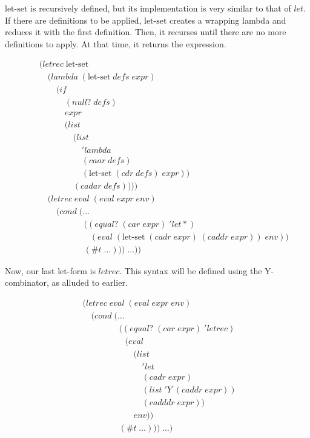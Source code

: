 $\text{let-set}$ is recursively defined, but its implementation is very similar to
that of $let$. If there are definitions to be applied, $\text{let-set}$ creates a
wrapping lambda and reduces it with the first definition. Then, it recurses
until there are no more definitions to apply. At that time, it returns the
expression.

\begin{figure}[htp]
\caption{}\label{fig:letSetDef}
\begin{align*}
& (letrec \; \text{let-set} \; 
\\& \quad (lambda \; (\text{let-set} \; defs \; expr)
\\& \qquad (if
\\& \qquad \quad (null? \; defs)
\\& \qquad \quad expr
\\& \qquad \quad (list \; 
\\& \qquad \qquad (list \; 
\\& \qquad \qquad \quad 'lambda \; 
\\& \qquad \qquad \quad (caar \; defs) \; 
\\& \qquad \qquad \quad (\text{let-set} \; (cdr \; defs) \; expr)) \; 
\\& \qquad \qquad (cadar \; defs))))
\\& \quad (letrec \; eval \; (eval \; expr \; env)
\\& \qquad (cond \; (\dots
\\& \qquad \qquad \quad \; ((equal? \; (car \; expr) \; 'let*) \; 
\\& \qquad \qquad \qquad (eval \; (\text{let-set} \; (cadr \; expr) \; (caddr \; expr)) \; env))
\\& \qquad \qquad \quad \; (\#t \; \dots))) \; \dots))
\end{align*}
\end{figure}

Now, our last let-form is $letrec$. This syntax will be defined using the Y-
combinator, as alluded to earlier.

\begin{figure}[htp]
\caption{}\label{fig:letRecDef}
\begin{align*}
& (letrec \; eval \; (eval \; expr \; env)
\\& \quad (cond \; (\dots
\\& \qquad \qquad \; ((equal? \; (car \; expr) \; 'letrec)
\\& \qquad \qquad \quad (eval
\\& \qquad \qquad \qquad (list \; 
\\& \qquad \qquad \qquad \quad 'let \; 
\\& \qquad \qquad \qquad \quad (cadr \; expr) \; 
\\& \qquad \qquad \qquad \quad (list \; 'Y \; (caddr \; expr)) \; 
\\& \qquad \qquad \qquad \quad (cadddr \; expr))
\\& \qquad \qquad \qquad env))
\\& \qquad \qquad \; (\#t \; \dots))) \; \dots)
\end{align*}
\end{figure}

